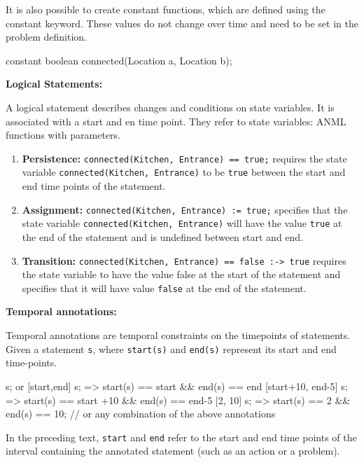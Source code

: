 It is also possible to create constant functions, which are defined using the constant keyword.
These values do not change over time and need to be set in the problem definition.

\begin{anmlcode}
constant boolean connected(Location a, Location b);
\end{anmlcode}



{\bf Logical Statements:}

A logical statement describes changes and conditions on state variables. It is
associated with a start and en time point.
They refer to state variables: ANML functions with parameters.
\begin{enumerate}
  \item {\bf Persistence:} \lstinline!connected(Kitchen, Entrance) == true;! requires the state
  variable \lstinline!connected(Kitchen, Entrance)! to be \lstinline!true! between the start and
  end time points of the statement.
  \item {\bf Assignment:} \lstinline!connected(Kitchen, Entrance) := true;! specifies that the
  state variable \lstinline!connected(Kitchen, Entrance)! will have the value \lstinline!true! at
  the end of the statement and is undefined between start and end.
  \item {\bf Transition:} \lstinline!connected(Kitchen, Entrance) == false :-> true! requires the
  state variable to have the value false at the start of the statement and
  specifies that it will have value \lstinline!false! at the end of the statement.
\end{enumerate}

{\bf Temporal annotations:}

Temporal annotations are temporal constraints on the timepoints of
statements. Given a statement \lstinline!s!, where \lstinline!start(s)! and \lstinline!end(s)! represent its
start and end time-points.
\begin{anmlcode}
[all] s; or [start,end] s;
=> start(s) == start && end(s) == end
[start+10, end-5] s;
=> start(s) == start +10 && end(s) == end-5
[2, 10] s;
=> start(s) == 2 && end(s) == 10;
// or any combination of the above annotations
\end{anmlcode}
  
In the preceding text, \lstinline!start! and \lstinline!end! refer to the start and end time
points of the interval containing the annotated statement (such as an action
or a problem).

